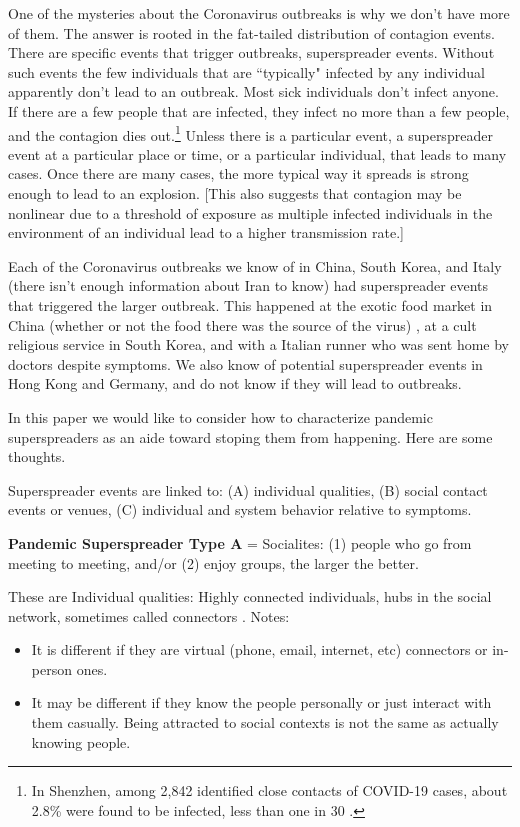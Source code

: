 \documentclass[onecolumn,journal]{IEEEtran}
\begin{document}
\begin{multicols}{2}

One of the mysteries about the Coronavirus outbreaks is why we don't have more of them. The answer is rooted in the fat-tailed distribution of contagion events. There are specific events that trigger outbreaks, superspreader events. Without such events the few individuals that are ``typically"  infected by any individual apparently don't lead to an outbreak. Most sick individuals don't infect anyone. If there are a few people that are infected, they infect no more than a few people, and the contagion dies out.\footnote{In Shenzhen, among 2,842 identified close contacts of COVID-19 cases, about 2.8\% were found to be infected, less than one in 30 \cite{1}.}  Unless there is a particular event, a superspreader event at a particular place or time, or a particular individual, that leads to many cases. Once there are many cases, the more typical way it spreads is strong enough to lead to an explosion. [This also suggests that contagion may be nonlinear due to a threshold of exposure as multiple infected individuals in the environment of an individual lead to a higher transmission rate.]

Each of the Coronavirus outbreaks we know of in China, South Korea, and Italy (there isn't enough information about Iran to know) had superspreader events that triggered the larger outbreak. This happened at the exotic food market in China (whether or not the food there was the source of the virus) \cite{1}, at a cult religious service in South Korea\cite{2}, and with a Italian runner who was sent home by doctors despite symptoms\cite{3}. We also know of potential superspreader events in Hong Kong\cite{4} and Germany\cite{5}, and do not know if they will lead to outbreaks.

In this paper we would like to consider how to characterize pandemic superspreaders as an aide toward stoping them from happening. Here are some thoughts.

\indent Superspreader events are linked to: (A) individual qualities, (B) social contact events or venues, (C) individual and system behavior relative to symptoms.

\textbf{Pandemic Superspreader Type A} = Socialites: (1) people who go from meeting to meeting,
			and/or (2) enjoy groups, the larger the better. 
			
These are Individual qualities: Highly connected individuals, hubs in the social network, sometimes called connectors \cite{gladwell}. Notes:
\begin{itemize}
		\item It is different if they are virtual (phone, email, internet, etc) connectors or in-person ones. 
		\item It may be different if they know the people personally or just interact with them casually. Being attracted to social contexts is not the same as actually knowing people. 
\end{itemize}


\end{multicols}
\end{document}

